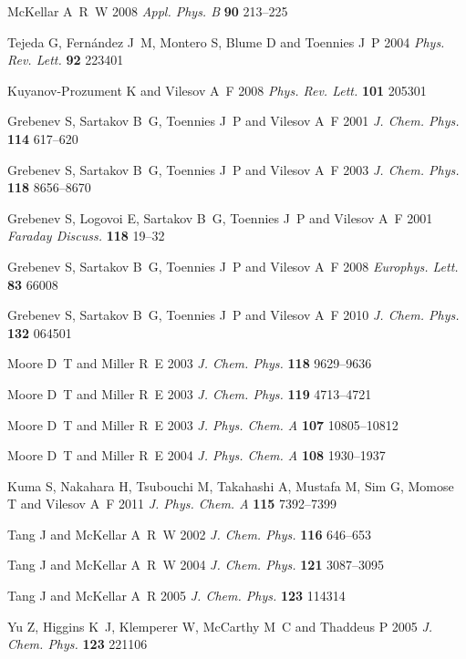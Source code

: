 \documentclass[12pt]{iopart}
\begin{document}
\begin{thebibliography}{100}
McKellar A~R~W 2008 {\em Appl. Phys. B\/} {\bf 90} 213--225

Tejeda G, Fern{\'a}ndez J~M, Montero S, Blume D and Toennies J~P 2004 {\em
  Phys. Rev. Lett.\/} {\bf 92} 223401

{Kuyanov-Prozument} K and Vilesov A~F 2008 {\em Phys. Rev. Lett.\/} {\bf 101}
  205301

Grebenev S, Sartakov B~G, Toennies J~P and Vilesov A~F 2001 {\em J. Chem.
  Phys.\/} {\bf 114} 617--620

Grebenev S, Sartakov B~G, Toennies J~P and Vilesov A~F 2003 {\em J. Chem.
  Phys.\/} {\bf 118} 8656--8670

Grebenev S, Logovoi E, Sartakov B~G, Toennies J~P and Vilesov A~F 2001 {\em
  Faraday Discuss.\/} {\bf 118} 19--32

Grebenev S, Sartakov B~G, Toennies J~P and Vilesov A~F 2008 {\em Europhys.
  Lett.\/} {\bf 83} 66008

Grebenev S, Sartakov B~G, Toennies J~P and Vilesov A~F 2010 {\em J. Chem.
  Phys.\/} {\bf 132} 064501

Moore D~T and Miller R~E 2003 {\em J. Chem. Phys.\/} {\bf 118} 9629--9636

Moore D~T and Miller R~E 2003 {\em J. Chem. Phys.\/} {\bf 119} 4713--4721

Moore D~T and Miller R~E 2003 {\em J. Phys. Chem. A\/} {\bf 107} 10805--10812

Moore D~T and Miller R~E 2004 {\em J. Phys. Chem. A\/} {\bf 108} 1930--1937

Kuma S, Nakahara H, Tsubouchi M, Takahashi A, Mustafa M, Sim G, Momose T and
  Vilesov A~F 2011 {\em J. Phys. Chem. A\/} {\bf 115} 7392--7399

Tang J and McKellar A~R~W 2002 {\em J. Chem. Phys.\/} {\bf 116} 646--653

Tang J and McKellar A~R~W 2004 {\em J. Chem. Phys.\/} {\bf 121} 3087--3095

Tang J and McKellar A~R 2005 {\em J. Chem. Phys.\/} {\bf 123} 114314

Yu Z, Higgins K~J, Klemperer W, McCarthy M~C and Thaddeus P 2005 {\em J. Chem.
  Phys.\/} {\bf 123} 221106


\end{thebibliography}
\end{document}
